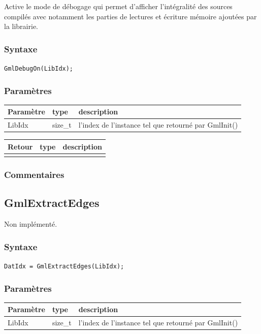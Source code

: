 \documentclass[a4paper,12pt]{article}
\begin{document}
Active le mode de débogage qui permet d'afficher l'intégralité des sources compilés avec notamment les parties de lectures et écriture mémoire ajoutées par la librairie.

\subsubsection*{Syntaxe}

{\tt GmlDebugOn(LibIdx);}

\subsubsection*{Paramètres}

\begin{tabular}{|m{2cm}|m{1.5cm}|m{10.5cm}|}
\hline
Paramètre  & type    & description \\
\hline
LibIdx     & size\_t & l'index de l'instance tel que retourné par GmlInit() \\
\hline
\end{tabular}

\medskip

\begin{tabular}{|m{2cm}|m{1.5cm}|m{10.5cm}|}
\hline
Retour     & type   & description \\
\hline
 & & \\
\hline
\end{tabular}

\subsubsection*{Commentaires}


\subsection{GmlExtractEdges}
Non implémenté.

\subsubsection*{Syntaxe}

{\tt DatIdx = GmlExtractEdges(LibIdx);}

\subsubsection*{Paramètres}

\begin{tabular}{|m{2cm}|m{1.5cm}|m{10.5cm}|}
\hline
Paramètre  & type    & description \\
\hline
LibIdx     & size\_t & l'index de l'instance tel que retourné par GmlInit() \\
\hline
\end{tabular}
\end{document}
